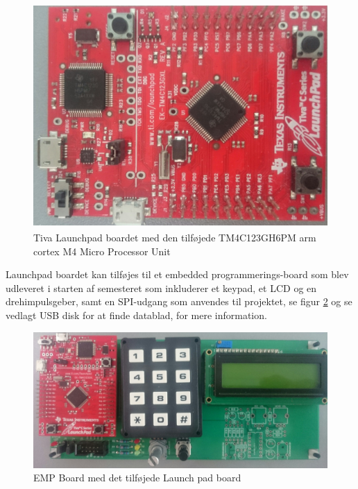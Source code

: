 \begin{figure}[!ht]
	\begin{center}
		\includegraphics[scale=0.08, angle =270]{Billeder/TivaLaunchPad.JPG}
	\end{center}
\caption{Tiva\textsuperscript{\texttrademark} Launchpad boardet med den tilføjede TM4C123GH6PM arm cortex M4 Micro Processor Unit}
\label{fig:TivaLaunchPad}
\end{figure}

Launchpad boardet kan tilføjes til et embedded programmerings-board som blev udleveret i starten af semesteret som inkluderer et keypad, et LCD og en drehimpulsgeber, samt en SPI-udgang som anvendes til projektet, se figur \ref{fig:EMP_BOARD} og se vedlagt USB disk for at finde datablad, for mere information.

\begin{figure}[!ht]
	\begin{center}
		\includegraphics[scale=0.08, angle =0]{Billeder/EMP_BOARD.JPG}
	\end{center}
\caption{EMP Board med det tilføjede Launch pad board}
\label{fig:EMP_BOARD}
\end{figure}

